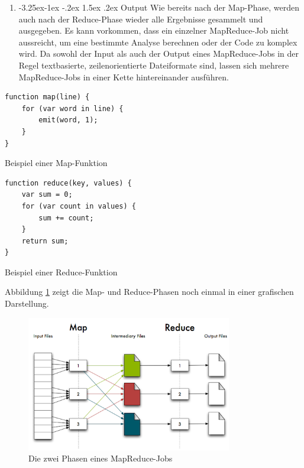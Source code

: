 \documentclass[a4paper]{article}
\makeatletter
\renewcommand\paragraph{\@startsection{paragraph}{4}{\z@}%
  {-3.25ex\@plus -1ex \@minus -.2ex}%
  {1.5ex \@plus .2ex}%
  {\normalfont\normalsize\bfseries}}
\makeatother
\begin{document}
\begin{enumerate}
    \item \paragraph{Output}
Wie bereits nach der Map-Phase, werden auch nach der Reduce-Phase wieder alle Ergebnisse gesammelt und ausgegeben. Es kann vorkommen, dass ein einzelner MapReduce-Job nicht aussreicht, um eine bestimmte Analyse berechnen oder der Code zu komplex wird. Da sowohl der Input als auch der Output eines MapReduce-Jobs in der Regel textbasierte, zeilenorientierte Dateiformate sind, lassen sich mehrere MapReduce-Jobs in einer Kette hintereinander ausführen.
\end{enumerate}

\begin{listing}[H]
\begin{verbatim}
function map(line) {
    for (var word in line) {
        emit(word, 1);
    }
}
\end{verbatim}
\caption{Beispiel einer Map-Funktion}
\label{lst:map}
\end{listing}

\begin{listing}[H]
\begin{verbatim}
function reduce(key, values) {
    var sum = 0;
    for (var count in values) {
        sum += count;
    }
    return sum;
}
\end{verbatim}
\caption{Beispiel einer Reduce-Funktion}
\label{lst:reduce}
\end{listing}

Abbildung \ref{fig:mapreduce} zeigt die Map- und Reduce-Phasen noch einmal in einer grafischen Darstellung.

\begin{figure}[H]
\centering
\includegraphics[width=0.8\textwidth]{mapreduce.png}
\caption{Die zwei Phasen eines MapReduce-Jobs \protect\cite{GARFINKEL}}
\label{fig:mapreduce}
\end{figure}
\end{document}
